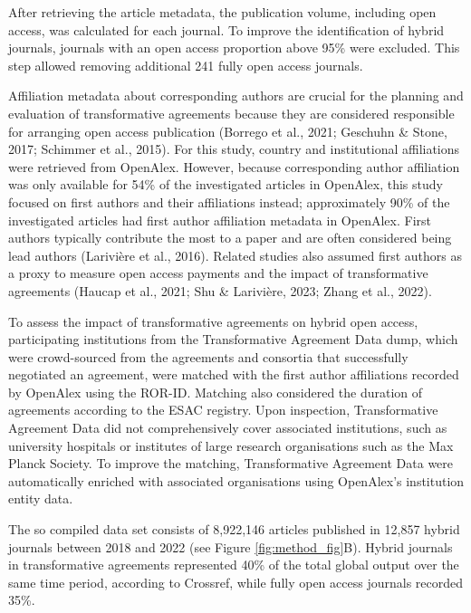\documentclass[a4paper,man,floatsintext,longtable,noextraspace,12pt]{apa6}
\begin{document}
After retrieving the article metadata, the publication volume, including
open access, was calculated for each journal. To improve the
identification of hybrid journals, journals with an open access
proportion above 95\% were excluded. This step allowed removing
additional 241 fully open access journals.

Affiliation metadata about corresponding authors are crucial for the
planning and evaluation of transformative agreements because they are
considered responsible for arranging open access publication (Borrego et
al., 2021; Geschuhn \& Stone, 2017; Schimmer et al., 2015). For this
study, country and institutional affiliations were retrieved from
OpenAlex. However, because corresponding author affiliation was only
available for 54\% of the investigated articles in OpenAlex, this study
focused on first authors and their affiliations instead; approximately
90\% of the investigated articles had first author affiliation metadata
in OpenAlex. First authors typically contribute the most to a paper and
are often considered being lead authors (Larivière et al., 2016).
Related studies also assumed first authors as a proxy to measure open
access payments and the impact of transformative agreements (Haucap et
al., 2021; Shu \& Larivière, 2023; Zhang et al., 2022).

To assess the impact of transformative agreements on hybrid open access,
participating institutions from the Transformative Agreement Data dump,
which were crowd-sourced from the agreements and consortia that
successfully negotiated an agreement, were matched with the first author
affiliations recorded by OpenAlex using the ROR-ID. Matching also
considered the duration of agreements according to the ESAC registry.
Upon inspection, Transformative Agreement Data did not comprehensively
cover associated institutions, such as university hospitals or
institutes of large research organisations such as the Max Planck
Society. To improve the matching, Transformative Agreement Data were
automatically enriched with associated organisations using OpenAlex's
institution entity data.

The so compiled data set consists of 8,922,146 articles published in
12,857 hybrid journals between 2018 and 2022 (see Figure
\ref{fig:method_fig}B). Hybrid journals in transformative agreements
represented 40\% of the total global output over the same time period,
according to Crossref, while fully open access journals recorded 35\%.
\end{document}
